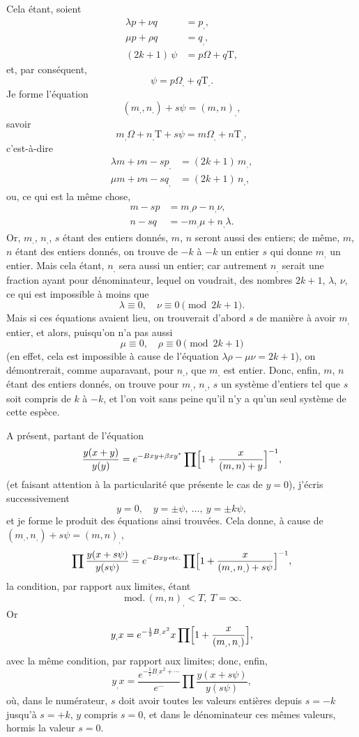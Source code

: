 \documentclass[11pt,a4paper]{article}
\providecommand{\md}{\,\mathrm{mod.}\,}
\begin{document}
\medskip

Cela \'etant, soient
\begin{align*}
\lambda p + \nu q &= p_{,},\\
\mu p + \rho q &= q_{,},\\
(2k+1)\,\psi &= p\Omega + q\mathrm{T},
\end{align*}
et, par cons\'equent,
\[ \psi = p\Omega_{,} + q\mathrm{T}_{,}. \]
Je forme l'\'equation
\[
(m_{,}, n_{,}) + s\psi = (m, n)_{,},
\]
savoir
\[
m_{,}\Omega + n_{,}\mathrm{T} + s\psi = m\Omega_{,} + n\mathrm{T}_{,},
\]
c'est-\`a-dire
\begin{align*}
\lambda m + \nu n - s p_{,} &= (2k+1)\,m_{,},\\
\mu m + \nu n - s q_{,} &= (2k+1)\,n_{,},
\end{align*}
ou, ce qui est la m\^eme chose,
\begin{align*}
m - sp &= m_{,}\rho - n_{,}\nu,\\
n - sq &= -m_{,}\mu + n_{,}\lambda.
\end{align*}
Or, $m_{,}$, $n_{,}$, $s$ \'etant des entiers donn\'es, $m$, $n$ seront aussi des entiers; de m\^eme, $m$, $n$ \'etant des entiers donn\'es, on trouve de $-k$ \`a $-k$ un entier $s$ qui donne $m_{,}$ un entier. Mais cela \'etant, $n_{,}$ sera aussi un entier; car autrement $n_{,}$ serait une fraction ayant pour d\'enominateur, lequel on voudrait, des nombres $2k+1$, $\lambda$, $\nu$, ce qui est impossible \`a moins que
\[ \lambda \equiv 0,\quad \nu \equiv 0 \pmod{2k+1}. \]
Mais si ces \'equations avaient lieu, on trouverait d'abord $s$ de mani\`ere \`a avoir $m_{,}$ entier, et alors, puisqu'on n'a pas aussi
\[ \mu \equiv 0,\quad \rho \equiv 0 \pmod{2k+1} \]
(en effet, cela est impossible \`a cause de l'\'equation $\lambda\rho - \mu\nu = 2k+1$), on d\'emontrerait, comme auparavant, pour $n_{,}$, que $m_{,}$ est entier. Donc, enfin, $m$, $n$ \'etant des entiers donn\'es, on trouve pour $m_{,}$, $n_{,}$, $s$ un syst\`eme d'entiers tel que $s$ soit compris de $k$ \`a $-k$, et l'on voit sans peine qu'il n'y a qu'un seul syst\`eme de cette esp\`ece.

\medskip

A pr\'esent, partant de l'\'equation
\[
\frac{y(x + y)}{y(y)} = e^{-Bxy + \beta x y^*}\prod\Bigl[1 + \frac{x}{(m, n) + y}\Bigr]^{-1},
\]
(et faisant attention \`a la particularit\'e que pr\'esente le cas de $y = 0$), j'\'ecris successivement
\[ y = 0,\quad y = \pm\psi,\ \ldots,\ y = \pm k\psi, \]
et je forme le produit des \'equations ainsi trouv\'ees. Cela donne, \`a cause de $(m_{,}, n_{,}) + s\psi = (m, n)_{,}$,
\[
\prod \frac{y(x + s\psi)}{y(s\psi)} = e^{-Bxy\,\text{etc.}} \prod\Bigl[1 + \frac{x}{(m_{,}, n_{,}) + s\psi}\Bigr]^{-1},
\]
la condition, par rapport aux limites, \'etant
\[ \md(m, n)_{,} < T,\ T = \infty. \]
Or
\[
y_{,} x = e^{-\frac{1}{2} B_{,} x^2} x \prod \Bigl[1 + \frac{x}{(m_{,}, n_{,})}\Bigr],
\]
avec la m\^eme condition, par rapport aux limites; donc, enfin,
\[
y_{,} x = \frac{e^{-\frac{1}{2} B_{,} x^2 + \cdots}}{e^{\cdots}}\prod \frac{y(x + s\psi)}{y(s\psi)},
\]
o\`u, dans le num\'erateur, $s$ doit avoir toutes les valeurs enti\`eres depuis $s = -k$ jusqu'\`a $s = +k$, $y$ compris $s = 0$, et dans le d\'enominateur ces m\^emes valeurs, hormis la valeur $s = 0$.
\end{document}
